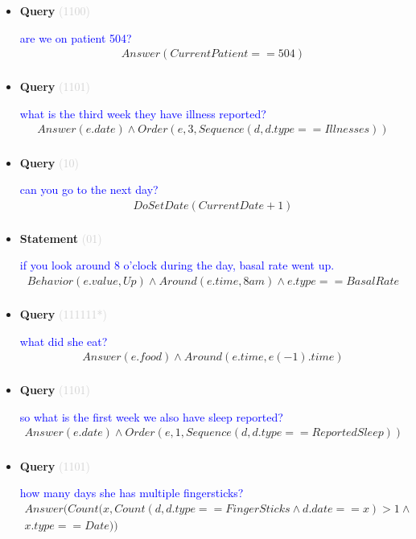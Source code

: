 \documentclass[11pt]{article}
\newcommand{\key}[1]{\textcolor{lightgray}{#1}}
\newcounter{CQuery}
\newcounter{CStatement}
\begin{document}
\begin{itemize}
\item
\textbf{Query\theCQuery} \key{(1100)} \addtocounter{CQuery}{1}
\textcolor{blue}{ are we on patient 504? }
\begin{multline*}
Answer(CurrentPatient==504) \\ 
\end{multline*}


\item
\textbf{Query\theCQuery} \key{(1101)} \addtocounter{CQuery}{1}
\textcolor{blue}{ what is the third week they have illness reported? }
\begin{multline*}
Answer(e.date) \wedge Order(e, 3, Sequence(d, d.type==Illnesses)) \\ 
\end{multline*}


\item
\textbf{Query\theCQuery} \key{(10)} \addtocounter{CQuery}{1}
\textcolor{blue}{ can you go to the next day? }
\begin{multline*}
DoSetDate(CurrentDate + 1) \\ 
\end{multline*}


\item
\textbf{Statement\theCStatement} \key{(01)} \addtocounter{CStatement}{1}
\textcolor{blue}{ if you look around 8 o'clock during the day, basal rate went up. }
\begin{multline*}
Behavior(e.value, Up) \wedge Around(e.time, 8am) \wedge e.type==BasalRate \\ 
\end{multline*}


\item
\textbf{Query\theCQuery} \key{(111111*)} \addtocounter{CQuery}{1}
\textcolor{blue}{ what did she eat? }
\begin{multline*}
Answer(e.food) \wedge Around(e.time, e(-1).time) \\ 
\end{multline*}


\item
\textbf{Query\theCQuery} \key{(1101)} \addtocounter{CQuery}{1}
\textcolor{blue}{ so what is the first week we also have sleep reported? }
\begin{multline*}
Answer(e.date) \wedge Order(e, 1, Sequence(d, d.type==ReportedSleep)) \\ 
\end{multline*}


\item
\textbf{Query\theCQuery} \key{(1101)} \addtocounter{CQuery}{1}
\textcolor{blue}{ how many days she has multiple fingersticks? }
\begin{multline*}
Answer(Count(x, Count(d, d.type==FingerSticks \wedge d.date==x)>1 \wedge \\ 
x.type==Date)) \\ 
\end{multline*}



\end{itemize}
\end{document}
